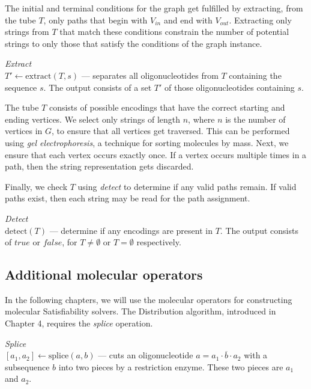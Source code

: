 The initial and terminal conditions for the graph get fulfilled by extracting, from the tube $T$, only paths that begin with $V_{in}$ and end with $V_{out}$.  Extracting only strings from $T$ that match these conditions constrain the number of potential strings to only those that satisfy the conditions of the graph instance.

\begin{definition}
\textit{Extract}\\
$ T' \leftarrow \text{extract}( T, s)$ --- separates all oligonucleotides from $T$ containing the sequence $s$.  The output consists of a set $T'$ of those oligonucleotides containing $s$.
\end{definition}

The tube $T$ consists of possible encodings that have the correct starting and ending vertices. We select only strings of length $n$, where $n$ is the number of vertices in $G$, to ensure that all vertices get traversed.  This can be performed using \textit{gel electrophoresis}, a technique for sorting molecules by mass.  Next, we ensure that each vertex occurs exactly once.  If a vertex occurs multiple times in a path, then the string representation gets discarded.

Finally, we check $T$ using \textit{detect} to determine if any valid paths remain.  If valid paths exist, then each string may be read for the path assignment.

\begin{definition}
\textit{Detect}\\
$ \text{detect}( T)$ --- determine if any encodings are present in $T$.  The output consists of $true$ or $false$, for $T \neq \emptyset$ or $T = \emptyset$ respectively.
\end{definition}

\subsection{Additional molecular operators}

In the following chapters, we will use the molecular operators for constructing molecular {\sc Satisfiability} solvers.  The Distribution algorithm, introduced in Chapter 4, requires the \textit{splice} operation.
\begin{definition}
\textit{Splice}\\
$[a_1, a_2] \leftarrow \text{splice}(a, b)$ --- cuts an oligonucleotide $a = a_1 \cdot \overline{b} \cdot a_2$ with a subsequence $b$ into two pieces by a restriction enzyme.  These two pieces are $a_1$ and $a_2$.
\end{definition}

